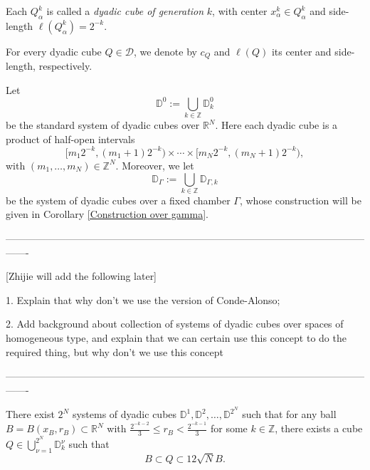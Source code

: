 \documentclass[12pt]{amsart}
\begin{document}
Each $Q^k_{\alpha}$ is called a \textit{dyadic cube of generation} $k$, with center $x^k_{\alpha}\in Q^k_{\alpha}$ and side-length $\ell(Q^k_{\alpha})=2^{-k}$.
\begin{nota}
For every dyadic cube $Q\in\mathscr{D}$, we denote by $c_Q$ and $\ell(Q)$ its center and side-length, respectively.
\end{nota}

\begin{nota}\label{standardsystem}
Let $$\mathbb{D}^0:=\bigcup_{k\in\mathbb{Z}}\mathbb{D}_k^0$$ be the standard system of dyadic cubes over $\mathbb{R}^N$.
Here each dyadic cube is a product of half-open intervals
\[
[m_1 2^{-k}, (m_1+1)2^{-k}) \times \cdots \times [m_N 2^{-k}, (m_N+1)2^{-k}),
\]
with $(m_1,\ldots,m_N)\in \mathbb{Z}^N$. Moreover, we let $$\mathbb{D}_{\Gamma}:=\bigcup_{k\in\mathbb{Z}}\mathbb{D}_{\Gamma,k}$$ be the system of dyadic cubes over a fixed chamber $\Gamma$, whose  construction will be given in Corollary \ref{Construction over gamma}.
\end{nota}

{\color{red}

-------------------------------------------------------------------------------------------------------------------

{\color{red}[Zhijie will add the following later]}

1. Explain that why don't we use the version of Conde-Alonso;

2. Add background about collection of systems of dyadic cubes over spaces of homogeneous type, and explain that we can certain use this concept to do the required thing, but why don't we use this concept

-------------------------------------------------------------------------------------------------------------------
}


\begin{lemma}\label{Nsystems}
There exist $2^N$ systems of dyadic cubes $\mathbb{D}^1,\mathbb{D}^2,\ldots,\mathbb{D}^{2^N}$ such that for any ball $B=B(x_B,r_B)\subset \mathbb{R}^N$ with $\frac{2^{-k-2}}{3}\leq r_B< \frac{2^{-k-1}}{3}$ for some $k\in\mathbb{Z}$,  there exists a cube ${\displaystyle Q\in\bigcup_{\nu=1}^{2^N}\mathbb{D}^\nu_k}$ such that
$$B\subset Q\subset 12\sqrt{N} B.$$
\end{lemma}
\end{document}
